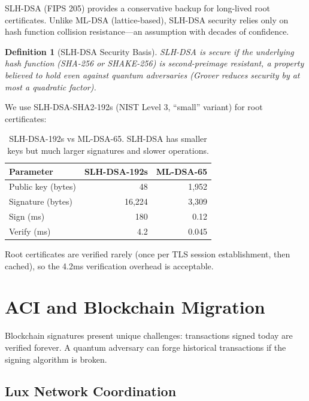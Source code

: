 \documentclass[11pt]{article}
\newtheorem{definition}{Definition}
\begin{document}
SLH-DSA (FIPS 205) provides a conservative backup for long-lived root
certificates. Unlike ML-DSA (lattice-based), SLH-DSA security relies only on
hash function collision resistance---an assumption with decades of confidence.

\begin{definition}[SLH-DSA Security Basis]
SLH-DSA is secure if the underlying hash function (SHA-256 or SHAKE-256) is
second-preimage resistant, a property believed to hold even against quantum
adversaries (Grover reduces security by at most a quadratic factor).
\end{definition}

We use SLH-DSA-SHA2-192s (NIST Level 3, ``small'' variant) for root
certificates:

\begin{table}[H]
\centering
\small
\begin{tabular}{lrr}
\toprule
\textbf{Parameter} & \textbf{SLH-DSA-192s} & \textbf{ML-DSA-65} \\
\midrule
Public key (bytes) & 48 & 1,952 \\
Signature (bytes) & 16,224 & 3,309 \\
Sign (ms) & 180 & 0.12 \\
Verify (ms) & 4.2 & 0.045 \\
\bottomrule
\end{tabular}
\caption{SLH-DSA-192s vs ML-DSA-65. SLH-DSA has smaller keys but much larger
signatures and slower operations.}
\label{tab:slhdsa}
\end{table}

Root certificates are verified rarely (once per TLS session establishment, then
cached), so the 4.2ms verification overhead is acceptable.

\section{ACI and Blockchain Migration}
\label{sec:blockchain}

Blockchain signatures present unique challenges: transactions signed today are
verified forever. A quantum adversary can forge historical transactions if the
signing algorithm is broken.

\subsection{Lux Network Coordination}
\end{document}
